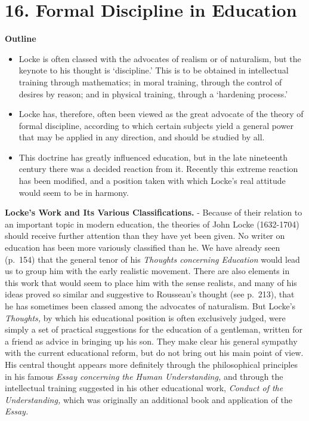 \documentclass[]{book}
\providecommand{\tightlist}{%
  \setlength{\itemsep}{0pt}\setlength{\parskip}{0pt}}
\begin{document}
\hypertarget{formal-discipline-in-education}{%
\chapter{16. Formal Discipline in Education}\label{formal-discipline-in-education}}

\textbf{Outline}

\begin{itemize}
\tightlist
\item
  Locke is often classed with the advocates of realism or of naturalism, but the keynote to his thought is `discipline.' This is to be obtained in intellectual training through mathematics; in moral training, through the control of desires by reason; and in physical training, through a `hardening process.'
\item
  Locke has, therefore, often been viewed as the great advocate of the theory of formal discipline, according to which certain subjects yield a general power that may be applied in any direction, and should be studied by all.
\item
  This doctrine has greatly influenced education, but in the late nineteenth century there was a decided reaction from it. Recently this extreme reaction has been modified, and a position taken with which Locke's real attitude would seem to be in harmony.
\end{itemize}

\textbf{Locke's Work and Its Various Classifications.} - Because of their relation to an important topic in modern education, the theories of John Locke (1632-1704) should receive further attention than they have yet been given. No writer on education has been more variously classified than he. We have already seen (p.~154) that the general tenor of his \emph{Thoughts concerning Education} would lead us to group him with the early realistic movement. There are also elements in this work that would seem to place him with the sense realists, and many of his ideas proved so similar and suggestive to Rousseau's thought (see p.~213), that he has sometimes been classed among the advocates of naturalism. But Locke's \emph{Thoughts,} by which his educational position is often exclusively judged, were simply a set of practical suggestions for the education of a gentleman, written for a friend as advice in bringing up his son. They make clear his general sympathy with the current educational reform, but do not bring out his main point of view. His central thought appears more definitely through the philosophical principles in his famous \emph{Essay concerning the Human Understanding,} and through the intellectual training suggested in his other educational work, \emph{Conduct of the Understanding,} which was originally an additional book and application of the \emph{Essay.}
\end{document}
